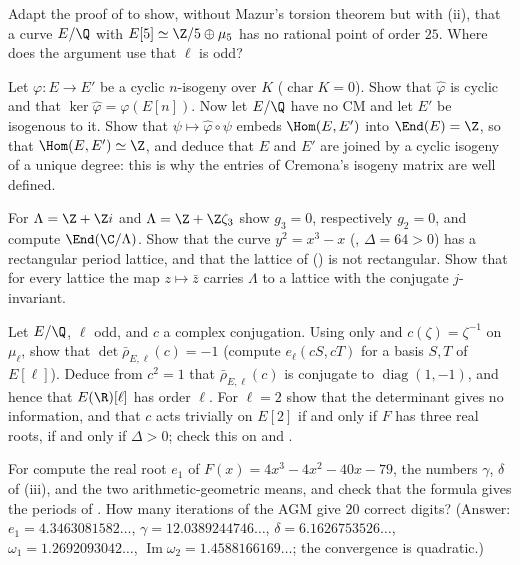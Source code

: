 \begin{exercise}\label{ex:ellcurves:ex-no25}
Adapt the proof of  to show, without Mazur's torsion theorem but with (ii), that a curve $E/\Q$ with $E[5]\simeq\Z/5\oplus\mu_5$ has no rational
point of order $25$. Where does the argument use that $\ell$ is odd?
\end{exercise}

\begin{exercise}\label{ex:ellcurves:ex-cyclicdual}
Let $\varphi\colon E\to E'$ be a cyclic $n$-isogeny over $K$ ($\operatorname{char}K=0$). Show that $\hat\varphi$ is cyclic and that $\ker\hat\varphi=\varphi(E[n])$. Now let $E/\Q$ have no CM and let $E'$ be
isogenous to it. Show that $\psi\mapsto\hat\varphi\circ\psi$ embeds $\Hom(E,E')$ into $\End(E)=\Z$, so that $\Hom(E,E')\simeq\Z$, and deduce that $E$ and $E'$ are joined by a cyclic isogeny of a
unique degree: this is why the entries of Cremona's isogeny matrix are well defined.
\end{exercise}

\begin{exercise}\label{ex:ellcurves:ex-lattices}
For $\Lambda=\Z+\Z i$ and $\Lambda=\Z+\Z\zeta_3$ show $g_3=0$, respectively $g_2=0$, and compute $\End(\C/\Lambda)$. Show that the curve $y^2=x^3-x$ (, $\Delta=64>0$) has a rectangular period
lattice, and that the lattice of  () is not rectangular. Show that for every lattice the map $z\mapsto\bar z$ carries $\Lambda$ to a lattice with the
conjugate $j$-invariant.
\end{exercise}

\begin{exercise}\label{ex:ellcurves:ex-weilconj}
Let $E/\Q$, $\ell$ odd, and $c$ a complex conjugation. Using only  and $c(\zeta)=\zeta^{-1}$ on $\mu_\ell$, show that
$\det\bar\rho_{E,\ell}(c)=-1$ (compute $e_\ell(cS,cT)$ for a basis $S,T$ of $E[\ell]$). Deduce from $c^2=1$ that $\bar\rho_{E,\ell}(c)$ is conjugate to $\operatorname{diag}(1,-1)$, and
hence that $E(\R)[\ell]$ has order $\ell$. For $\ell=2$ show that the determinant gives no information, and that $c$ acts trivially on $E[2]$ if and only if $F$ has three real
roots, if and only if $\Delta>0$; check this on  and .
\end{exercise}

\begin{exercise}\label{ex:ellcurves:ex-agm}
For  compute the real root $e_1$ of $F(x)=4x^3-4x^2-40x-79$, the numbers $\gamma$, $\delta$ of (iii), and the two arithmetic-geometric means,
and check that the formula gives the periods of . How many iterations of the AGM give $20$ correct digits? (Answer: $e_1=4.3463081582\ldots$,
$\gamma=12.0389244746\ldots$, $\delta=6.1626753526\ldots$, $\omega_1=1.2692093042\ldots$, $\operatorname{Im}\omega_2=1.4588166169\ldots$; the convergence is quadratic.)
\end{exercise}

